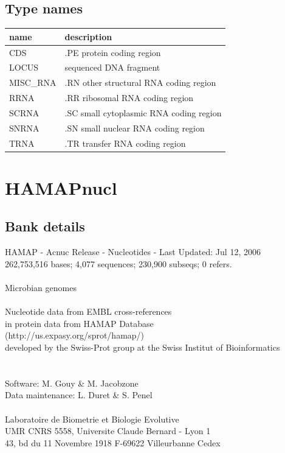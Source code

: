 \documentclass{article}
\begin{document}
\begin{Schunk}
\subsection{Type names}
\noindent\begin{tabular}{ll}
\hline \hline
name & description\\
\hline
CDS & .PE protein coding region \\
LOCUS & sequenced DNA fragment \\
MISC\_RNA & .RN other structural RNA coding region \\
RRNA & .RR ribosomal RNA coding region \\
SCRNA & .SC small cytoplasmic RNA coding region \\
SNRNA & .SN small nuclear RNA coding region \\
TRNA & .TR transfer RNA coding region \\
\hline \hline
\end{tabular}

\section{ HAMAPnucl }
\subsection{Bank details}
HAMAP - Acnuc Release - Nucleotides - Last Updated: Jul 12, 2006\\
262,753,516 bases; 4,077 sequences; 230,900 subseqs; 0 refers.\\
	\\
Microbian genomes\\
\\
Nucleotide data from  EMBL cross-references		\\
in protein data from  HAMAP Database\\
(http://us.expasy.org/sprot/hamap/)\\
developed by the Swiss-Prot group at the Swiss Institut of Bioinformatics\\
\\
\\
Software: M. Gouy \& M. Jacobzone\\
Data maintenance: L. Duret \& S. Penel\\
\\
Laboratoire de Biometrie et Biologie Evolutive\\
UMR CNRS 5558, Universite Claude Bernard - Lyon 1\\
43, bd du 11 Novembre 1918 F-69622 Villeurbanne Cedex\\



\end{Schunk}
\end{document}
